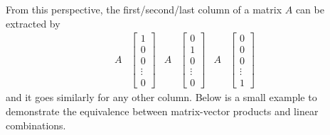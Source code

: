 From this perspective, the first/second/last column of a matrix $A$ can be extracted by
\begin{align*}
A&
\begin{bmatrix}
1 \\
0 \\
0 \\
\vdots \\
0
\end{bmatrix}
&
A&
\begin{bmatrix}
0 \\
1 \\
0 \\
\vdots \\
0
\end{bmatrix}
&
A&
\begin{bmatrix}
0 \\
0 \\
0 \\
\vdots \\
1
\end{bmatrix}
\end{align*}
and it goes similarly for any other column. Below is a small example to demonstrate the equivalence between matrix-vector products and linear combinations.
